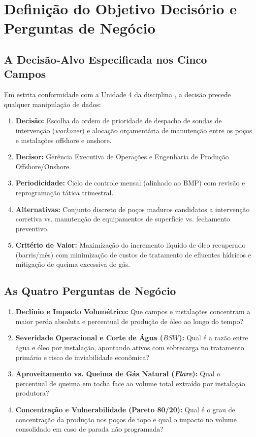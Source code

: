 \documentclass[12pt,a4paper]{article}
\begin{document}
\section{Definição do Objetivo Decisório e Perguntas de Negócio}

\subsection{A Decisão-Alvo Especificada nos Cinco Campos}
Em estrita conformidade com a Unidade 4 da disciplina \cite{serrano2026}, a decisão precede qualquer manipulação de dados:
\begin{enumerate}
    \item \textbf{Decisão:} Escolha da ordem de prioridade de despacho de sondas de intervenção (\textit{workover}) e alocação orçamentária de manutenção entre os poços e instalações offshore e onshore.
    \item \textbf{Decisor:} Gerência Executiva de Operações e Engenharia de Produção Offshore/Onshore.
    \item \textbf{Periodicidade:} Ciclo de controle mensal (alinhado ao BMP) com revisão e reprogramação tática trimestral.
    \item \textbf{Alternativas:} Conjunto discreto de poços maduros candidatos a intervenção corretiva vs. manutenção de equipamentos de superfície vs. fechamento preventivo.
    \item \textbf{Critério de Valor:} Maximização do incremento líquido de óleo recuperado (barris/mês) com minimização de custos de tratamento de efluentes hídricos e mitigação de queima excessiva de gás.
\end{enumerate}

\subsection{As Quatro Perguntas de Negócio}
\begin{enumerate}[label=\textbf{P\arabic*:}]
    \item \textbf{Declínio e Impacto Volumétrico:} Que campos e instalações concentram a maior perda absoluta e percentual de produção de óleo ao longo do tempo?
    \item \textbf{Severidade Operacional e Corte de Água ($BSW$):} Qual é a razão entre água e óleo por instalação, apontando ativos com sobrecarga no tratamento primário e risco de inviabilidade econômica?
    \item \textbf{Aproveitamento vs. Queima de Gás Natural (\textit{Flare}):} Qual o percentual de queima em tocha face ao volume total extraído por instalação produtora?
    \item \textbf{Concentração e Vulnerabilidade (Pareto 80/20):} Qual é o grau de concentração da produção nos poços de topo e qual o impacto no volume consolidado em caso de parada não programada?
\end{enumerate}
\end{document}
